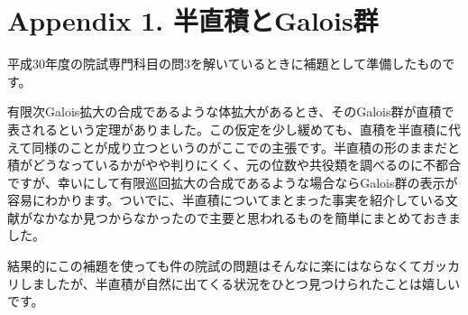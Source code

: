 
\section{Appendix 1. 半直積とGalois群}


平成30年度の院試専門科目の問3を解いているときに補題として準備したものです。

有限次Galois拡大の合成であるような体拡大があるとき、そのGalois群が直積で表されるという定理がありました。この仮定を少し緩めても、直積を半直積に代えて同様のことが成り立つというのがここでの主張です。半直積の形のままだと積がどうなっているかがやや判りにくく、元の位数や共役類を調べるのに不都合ですが、幸いにして有限巡回拡大の合成であるような場合ならGalois群の表示が容易にわかります。ついでに、半直積についてまとまった事実を紹介している文献がなかなか見つからなかったので主要と思われるものを簡単にまとめておきました。

結果的にこの補題を使っても件の院試の問題はそんなに楽にはならなくてガッカリしましたが、半直積が自然に出てくる状況をひとつ見つけられたことは嬉しいです。




